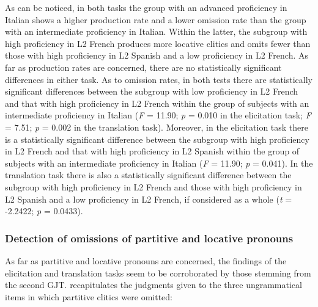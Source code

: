 \documentclass[output=paper,modfonts,nonflat,newtxmath]{langsci/langscibook}
\begin{document}
As can be noticed, in both tasks the group with an advanced proficiency in Italian shows a higher production rate and a lower omission rate than the group with an intermediate proficiency in Italian. Within the latter, the subgroup with high proficiency in L2 French produces more locative clitics and omits fewer than those with high proficiency in L2 Spanish and a low proficiency in L2 French. As far as production rates are concerned, there are no statistically significant differences in either task. As to omission rates, in both tests there are statistically significant differences between the subgroup with low proficiency in L2 French and that with high proficiency in L2 French within the group of subjects with an intermediate proficiency in Italian (\textit{F} = 11.90; \textit{p} = 0.010 in the elicitation task; \textit{F} = 7.51; \textit{p} = 0.002 in the translation task). Moreover, in the elicitation task there is a statistically significant difference between the subgroup with high proficiency in L2 French and that with high proficiency in L2 Spanish within the group of subjects with an intermediate proficiency in Italian (\textit{F} = 11.90; \textit{p} = 0.041). In the translation task there is also a statistically significant difference between the subgroup with high proficiency in L2 French and those with high proficiency in L2 Spanish and a low proficiency in L2 French, if considered as a whole (\textit{t} = -2.2422; \textit{p} = 0.0433).

\subsubsection{Detection {of} {omissions} {of} {partitive} {and} {locative} pronouns} %

As far as partitive and locative pronouns are concerned, the findings of the elicitation and translation tasks seem to be corroborated by those stemming from the second GJT.  recapitulates the judgments given to the three ungrammatical items in which partitive clitics were omitted:
\end{document}
